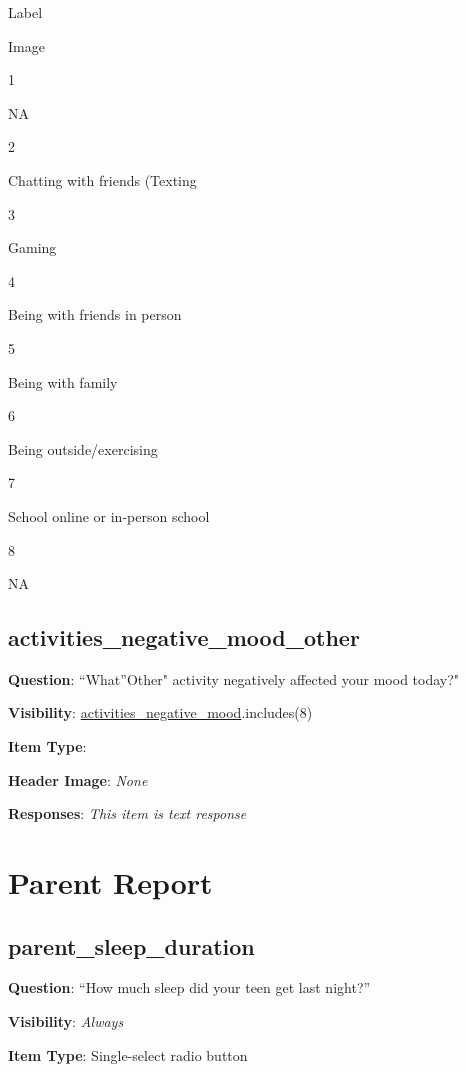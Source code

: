 \documentclass[]{book}
\begin{document}
Label

Image

1

NA

2

Chatting with friends (Texting

3

Gaming

4

Being with friends in person

5

Being with family

6

Being outside/exercising

7

School online or in-person school

8

NA

\hypertarget{activities_negative_mood_other}{%
\section{activities\_negative\_mood\_other}\label{activities_negative_mood_other}}

\textbf{Question}: ``What''Other" activity negatively affected your mood today?"

\textbf{Visibility}: \protect\hyperlink{activities_negative_mood}{activities\_negative\_mood}.includes(8)

\textbf{Item Type}:

\textbf{Header Image}: \emph{None}

\textbf{Responses}: \emph{This item is text response}

\hypertarget{morning_section}{%
\chapter{Parent Report}\label{morning_section}}

\hypertarget{parent_sleep_duration}{%
\section{parent\_sleep\_duration}\label{parent_sleep_duration}}

\textbf{Question}: ``How much sleep did your teen get last night?''

\textbf{Visibility}: \emph{Always}

\textbf{Item Type}: Single-select radio button
\end{document}
